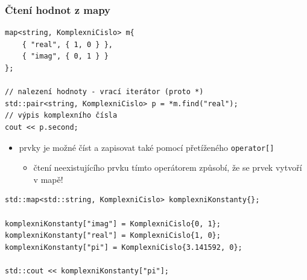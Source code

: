 \begin{frame}[fragile]
\frametitle{Čtení hodnot z mapy}
\begin{yesblock}
\begin{lstlisting}
map<string, KomplexniCislo> m{
	{ "real", { 1, 0 } },
	{ "imag", { 0, 1 } }
};

// nalezení hodnoty - vrací iterátor (proto *)
std::pair<string, KomplexniCislo> p = *m.find("real");
// výpis komplexního čísla
cout << p.second;
\end{lstlisting}
\end{yesblock}
\end{frame}




\begin{frame}[fragile]
\begin{block}{}
\begin{itemize}
\item prvky je možné číst a zapisovat také pomocí přetíženého \lstinline|operator[]|
\begin{itemize}
\item čtení neexistujícího prvku tímto operátorem způsobí, že se prvek vytvoří v mapě!
\end{itemize}

\end{itemize}
\end{block}

\begin{yesblock}
\begin{lstlisting}
std::map<std::string, KomplexniCislo> komplexniKonstanty{};

komplexniKonstanty["imag"] = KomplexniCislo{0, 1};
komplexniKonstanty["real"] = KomplexniCislo{1, 0};
komplexniKonstanty["pi"] = KomplexniCislo{3.141592, 0};

std::cout << komplexniKonstanty["pi"];
\end{lstlisting}
\end{yesblock}
\end{frame}




